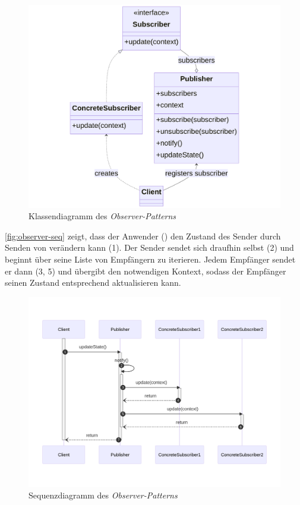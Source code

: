 \begin{figure}[!ht]
	\centering
	\includegraphics[width=0.95\linewidth]{images/patterns/observer-class.png}
	\caption{Klassendiagramm des \emph{Observer-Patterns} \cite{skobeleva_observer_2023}}
	\label{fig:observer-class}
\end{figure}

\autoref{fig:observer-seq} zeigt, dass der Anwender () den Zustand des Sender durch Senden von  verändern kann (1). Der Sender sendet sich draufhin selbst  (2) und beginnt über seine Liste von Empfängern zu iterieren. Jedem Empfänger sendet er dann  (3, 5) und übergibt den notwendigen Kontext, sodass der Empfänger seinen Zustand entsprechend aktualisieren kann.

\begin{figure}[!ht]
	\centering
	\includegraphics[width=0.95\linewidth]{images/patterns/observer-seq.png}
	\caption{Sequenzdiagramm des \emph{Observer-Patterns} \cite{skobeleva_observer_2023}}
	\label{fig:observer-seq}
\end{figure}

